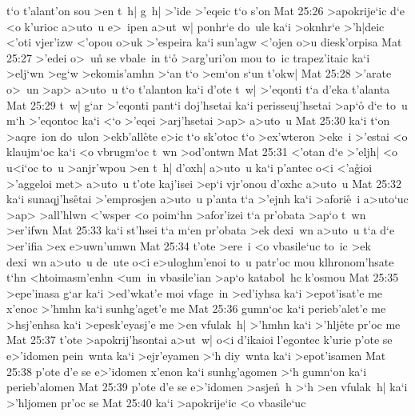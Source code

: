 t`o
t'alant'on
sou
>en
t~h|
g~h|
>'ide
>'eqeic
t`o
s'on\bibvsend
\vs Mat 25:26
>apokrije`ic
d`e
<o
k'urioc
a>uto~u
e>~ipen
a>ut~w|
ponhr`e
do~ule
ka`i
>oknhr`e
>'h|deic
<'oti
vjer'izw
<'opou
o>uk
>'espeira
ka`i
sun'agw
<'ojen
o>u
diesk'orpisa\bibvsend
\vs Mat 25:27
>'edei
o>~un\r{}
se
vbale~in
t`o\r{}
>arg'uri'on
mou
to~ic
trapez'itaic
ka`i
>elj`wn
>eg`w
>ekomis'amhn
>`an
t`o
>em`on
s`un
t'okw|\bibvsend
\vs Mat 25:28
>'arate
o>~un
>ap>
a>uto~u
t`o
t'alanton
ka`i
d'ote
t~w|
>'eqonti
t`a
d'eka
t'alanta\bibvsend
\vs Mat 25:29
t~w|
g`ar
>'eqonti
pant`i
doj'hsetai
ka`i
perisseuj'hsetai
>ap`o\r{}
d`e
to~u
m`h
>'eqontoc
ka`i
<`o
>'eqei
>arj'hsetai
>ap>
a>uto~u\bibvsend
\vs Mat 25:30
ka`i
t`on
>aqre~ion
do~ulon
>ekb'all\r{e}te
e>ic
t`o
sk'otoc
t`o
>ex'wteron
>eke~i
>'estai
<o
klaujm`oc
ka`i
<o
vbrugm`oc
t~wn
>od'ontwn\bibvsend
\vs Mat 25:31
<'otan
d`e
>'eljh|
<o
u<i`oc
to~u
>anjr'wpou
>en
t~h|
d'oxh|
a>uto~u
ka`i
p'antec
o<i
<'a\r{g}ioi
>'aggeloi
met>
a>uto~u
t'ote
kaj'isei
>ep`i
vjr'onou
d'oxhc
a>uto~u\bibvsend
\vs Mat 25:32
ka`i
sunaqj'hs\r{e}tai
>'emprosjen
a>uto~u
p'anta
t`a
>'ejnh
ka`i
>afori\r{e}~i
a>uto`uc
>ap>
>all'hlwn
<'wsper
<o
poim`hn
>afor'izei
t`a
pr'obata
>ap`o
t~wn
>er'ifwn\bibvsend
\vs Mat 25:33
ka`i
st'hsei
t`a
m`en
pr'obata
>ek
dexi~wn
a>uto~u
t`a
d`e
>er'ifia
>ex
e>uwn'umwn\bibvsend
\vs Mat 25:34
t'ote
>ere~i
<o
vbasile`uc
to~ic
>ek
dexi~wn
a>uto~u
de~ute
o<i
e>uloghm'enoi
to~u
patr'oc
mou
klhronom'hsate
t`hn
<htoimasm'enhn
<um~in
vbasile'ian
>ap`o
katabol~hc
k'osmou\bibvsend
\vs Mat 25:35
>epe'inasa
g`ar
ka`i
>ed'wkat'e
moi
vfage~in
>ed'iyhsa
ka`i
>epot'isat'e
me
x'enoc
>'hmhn
ka`i
sunhg'aget'e
me\bibvsend
\vs Mat 25:36
gumn`oc
ka`i
perieb'alet'e
me
>hsj'enhsa
ka`i
>epesk'eyasj'e
me
>en
vfulak~h|
>'hmhn
ka`i
>'hlj\r{e}te
pr'oc
me\bibvsend
\vs Mat 25:37
t'ote
>apokrij'hsontai
a>ut~w|
o<i
d'ikaioi
l'egontec
k'urie
p'ote
se
e>'idomen
pein~wnta
ka`i
>ejr'eyamen
>`h
diy~wnta
ka`i
>epot'isamen\bibvsend
\vs Mat 25:38
p'ote
d'e
se
e>'idomen
x'enon
ka`i
sunhg'agomen
>`h
gumn`on
ka`i
perieb'alomen\bibvsend
\vs Mat 25:39
p'ote
d'e
se
e>'idomen
>asje\r{n}~h
>`h
>en
vfulak~h|
ka`i
>'hljomen
pr'oc
se\bibvsend
\vs Mat 25:40
ka`i
>apokrije`ic
<o
vbasile`uc
